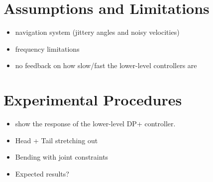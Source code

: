 \section{Assumptions and Limitations}
\begin{itemize}
    \item navigation system (jittery angles and noisy velocities)
    \item frequency limitations
    \item no feedback on how slow/fast the lower-level controllers are
\end{itemize}

\section{Experimental Procedures}
\begin{itemize}
    \item show the response of the lower-level DP+ controller.
    \item Head + Tail stretching out
    \item Bending with joint constraints
    \item Expected results?
\end{itemize}
